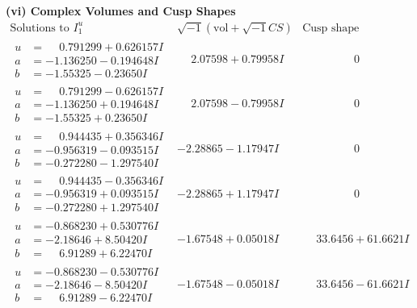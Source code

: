 \documentclass[1p]{elsarticle_modified}
\theoremstyle{definition}
\newcommand{\I}{\sqrt{-1}}
\begin{document}
\newpage\flushleft \textbf{(vi) Complex Volumes and Cusp Shapes}
$$\begin{array}{c|c|c}  
\text{Solutions to }I^u_{1}& \I (\text{vol} + \sqrt{-1}CS) & \text{Cusp shape}\\
 \hline 
\begin{aligned}
u &= \phantom{-}0.791299 + 0.626157 I \\
a &= -1.136250 - 0.194648 I \\
b &= -1.55325 - 0.23650 I\end{aligned}
 & \phantom{-}2.07598 + 0.79958 I & \phantom{-0.000000 } 0 \\ \hline\begin{aligned}
u &= \phantom{-}0.791299 - 0.626157 I \\
a &= -1.136250 + 0.194648 I \\
b &= -1.55325 + 0.23650 I\end{aligned}
 & \phantom{-}2.07598 - 0.79958 I & \phantom{-0.000000 } 0 \\ \hline\begin{aligned}
u &= \phantom{-}0.944435 + 0.356346 I \\
a &= -0.956319 - 0.093515 I \\
b &= -0.272280 - 1.297540 I\end{aligned}
 & -2.28865 - 1.17947 I & \phantom{-0.000000 } 0 \\ \hline\begin{aligned}
u &= \phantom{-}0.944435 - 0.356346 I \\
a &= -0.956319 + 0.093515 I \\
b &= -0.272280 + 1.297540 I\end{aligned}
 & -2.28865 + 1.17947 I & \phantom{-0.000000 } 0 \\ \hline\begin{aligned}
u &= -0.868230 + 0.530776 I \\
a &= -2.18646 + 8.50420 I \\
b &= \phantom{-}6.91289 + 6.22470 I\end{aligned}
 & -1.67548 + 0.05018 I & \phantom{-}33.6456 + 61.6621 I \\ \hline\begin{aligned}
u &= -0.868230 - 0.530776 I \\
a &= -2.18646 - 8.50420 I \\
b &= \phantom{-}6.91289 - 6.22470 I\end{aligned}
 & -1.67548 - 0.05018 I & \phantom{-}33.6456 - 61.6621 I \\ \hline\begin{aligned}

\end{aligned}
\end{array}$$
\end{document}

